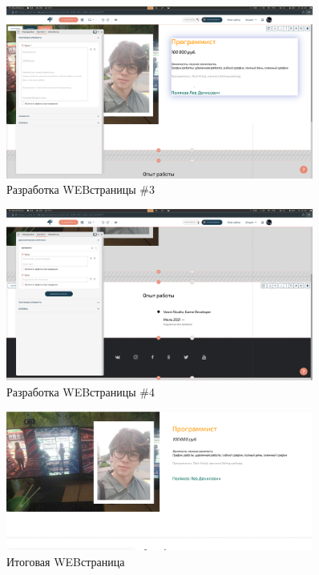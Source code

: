 \documentclass[14pt]{extarticle}
\begin{document}
\begin{figure}[h]
    \centering
	\includegraphics[width=0.9\textwidth, angle=0]{2021-10-19-22-25-47}
    \caption{Разработка WEB\-страницы \#3}
    \label{fig:html3}
\end{figure}

\begin{figure}[h]
    \centering
	\includegraphics[width=0.9\textwidth, angle=0]{2021-10-19-22-25-56}
    \caption{Разработка WEB\-страницы \#4}
    \label{fig:html4}
\end{figure}

\begin{figure}[h]
    \centering
	\includegraphics[width=0.9\textwidth, angle=0]{2021-12-12_18-29}
    \caption{Итоговая WEB\-страница}
    \label{fig:html4}
\end{figure}
\end{document}
